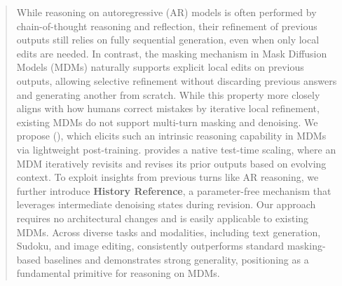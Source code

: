 \begin{abstract}

While reasoning on autoregressive (AR) models is often performed by chain-of-thought reasoning and reflection, their refinement of previous outputs still relies on fully sequential generation, even when only local edits are needed. In contrast, the masking mechanism in Mask Diffusion Models (MDMs) naturally supports explicit local edits on previous outputs, allowing selective refinement without discarding previous answers and generating another from scratch. While this property more closely aligns with how humans correct mistakes by iterative local refinement, existing MDMs do not support multi-turn masking and denoising. We propose \textbf{\methodfull} (\method), which elicits such an intrinsic reasoning capability in MDMs via lightweight post-training. \method provides a native test-time scaling, where an MDM iteratively revisits and revises its prior outputs based on evolving context. To exploit insights from previous turns like AR reasoning, we further introduce \textbf{History Reference}, a parameter-free mechanism that leverages intermediate denoising states during revision. Our approach requires no architectural changes and is easily applicable to existing MDMs. Across diverse tasks and modalities, including text generation, Sudoku, and image editing, \textbf{\methodfull} consistently outperforms standard masking-based baselines and demonstrates strong generality, positioning \method as a fundamental primitive for reasoning on MDMs.

\end{abstract}
